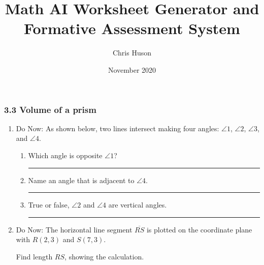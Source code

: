 \documentclass[12pt, twoside]{article}
\title{Math AI Worksheet Generator and Formative Assessment System}
\author{Chris Huson}
\date{November 2020}
\begin{document}
\subsubsection*{3.3 Volume of a prism}
\begin{enumerate}
  \item Do Now: As shown below, two lines intersect making four angles: $\angle 1$, $\angle 2$, $\angle 3$, and $\angle 4$.
  \begin{center}
  \end{center}
  \begin{enumerate}
  \item Which angle is opposite $\angle 1$? \rule{4cm}{0.15mm} \bigskip
  \item Name an angle that is adjacent to $\angle 4$. \rule{4cm}{0.15mm} \bigskip
  \item True or false, $\angle 2$ and $\angle 4$ are vertical angles. \rule{3cm}{0.15mm}
\end{enumerate}
  
\newpage
\item Do Now: The horizontal line segment $\overline{RS}$ is plotted on the coordinate plane with $R(2,3)$ and $S(7,3)$. 
  \begin{multicols}{2}
    Find length $RS$, showing the calculation.
      \begin{flushright}
      \end{flushright}
  \end{multicols} 


\end{enumerate}
\end{document}
